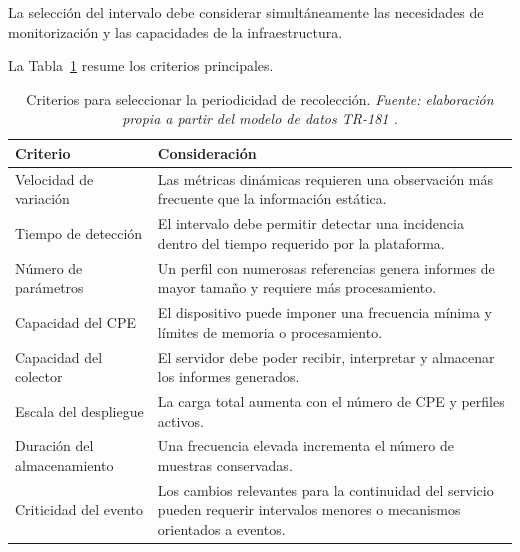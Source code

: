 La selección del intervalo debe considerar simultáneamente las
necesidades de monitorización y las capacidades de la infraestructura.

La Tabla~\ref{tab:criterios-periodicidad-recoleccion} resume los criterios
principales.

\begin{table}[H]
    \centering
    \small
    \renewcommand{\arraystretch}{1.35}

    \caption[Criterios para seleccionar la periodicidad de recolección.]
    {Criterios para seleccionar la periodicidad de recolección.
    \textit{Fuente: elaboración propia a partir del modelo de datos
    TR-181 \cite{bbf_tr181}.}}

    \label{tab:criterios-periodicidad-recoleccion}

    \begin{tabular}{
        p{}
        p{}
    }
        \hline

        \textbf{Criterio}
        &
        \textbf{Consideración}
        \\

        \hline

        Velocidad de variación
        &
        Las métricas dinámicas requieren una observación más frecuente
        que la información estática.
        \\

        Tiempo de detección
        &
        El intervalo debe permitir detectar una incidencia dentro del
        tiempo requerido por la plataforma.
        \\

        Número de parámetros
        &
        Un perfil con numerosas referencias genera informes de mayor
        tamaño y requiere más procesamiento.
        \\

        Capacidad del CPE
        &
        El dispositivo puede imponer una frecuencia mínima y límites de
        memoria o procesamiento.
        \\

        Capacidad del colector
        &
        El servidor debe poder recibir, interpretar y almacenar los
        informes generados.
        \\

        Escala del despliegue
        &
        La carga total aumenta con el número de CPE y perfiles activos.
        \\

        Duración del almacenamiento
        &
        Una frecuencia elevada incrementa el número de muestras
        conservadas.
        \\

        Criticidad del evento
        &
        Los cambios relevantes para la continuidad del servicio pueden
        requerir intervalos menores o mecanismos orientados a eventos.
        \\

        \hline
    \end{tabular}
\end{table}


